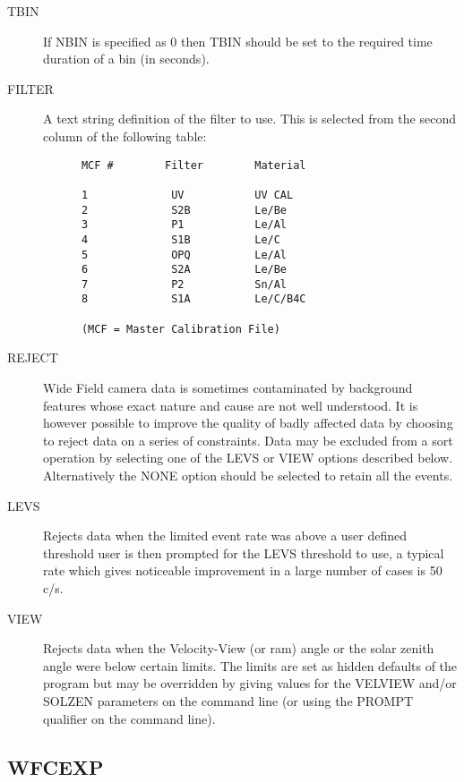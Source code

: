 \begin{description}
\item[TBIN]
If NBIN is specified as 0 then TBIN should be set to the required
time duration of a bin (in seconds).

\item[FILTER]
A text string definition of the filter to use. This is selected from
the second column of the following table:

\begin{verbatim}
      MCF #        Filter        Material

      1             UV           UV CAL
      2             S2B          Le/Be
      3             P1           Le/Al
      4             S1B          Le/C
      5             OPQ          Le/Al
      6             S2A          Le/Be
      7             P2           Sn/Al
      8             S1A          Le/C/B4C

      (MCF = Master Calibration File)
\end{verbatim}

\item[REJECT]
Wide Field camera data is sometimes contaminated by background features
whose exact nature and cause are not well understood. It is however
possible to improve the quality of badly affected data by choosing to
reject data on a series of constraints. Data may be excluded from a
sort operation by selecting one of the LEVS or VIEW options described
below. Alternatively the NONE option should be selected to retain all
the events.

\item[LEVS]
Rejects data when the limited event rate was above a user defined
threshold user is then prompted for the LEVS threshold to use, a typical
rate which gives noticeable improvement in a large number of cases is
50 c/s.

\item[VIEW]
Rejects data when the Velocity-View (or ram) angle or the solar zenith
angle were below certain limits. The limits are set as hidden defaults
of the program but may be overridden by giving values for the VELVIEW
and/or SOLZEN parameters on the command line (or using the PROMPT
qualifier on the command line).

\end{description}

\subsection{WFCEXP}
\label{sec:programs:wfcexp}

